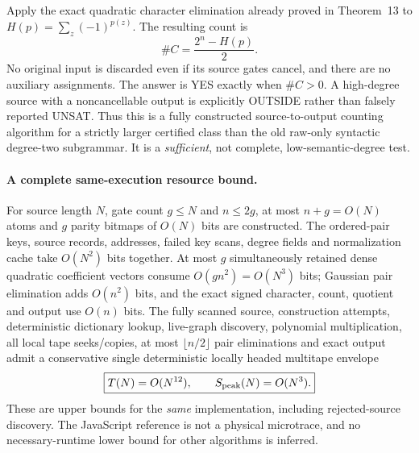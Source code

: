 \documentclass[11pt]{article}
\begin{document}
Apply the exact quadratic character elimination already proved in
Theorem~13 to
\(H(p)=\sum_z(-1)^{p(z)}\).  The resulting count is
\[
\boxed{\#C=\frac{2^n-H(p)}{2}.}
\]
No original input is discarded even if its source gates cancel, and
there are no auxiliary assignments.  The answer is YES exactly when
\(\#C>0\).  A high-degree source with a noncancellable output is
explicitly OUTSIDE rather than falsely reported UNSAT.
Thus this is a fully constructed source-to-output counting algorithm
for a strictly larger certified class than the old raw-only syntactic
degree-two subgrammar.  It is a \emph{sufficient}, not complete,
low-semantic-degree test.

\paragraph{A complete same-execution resource bound.}
For source length \(N\), gate count \(g\le N\) and
\(n\le2g\), at most \(n+g=O(N)\) atoms and \(g\)
parity bitmaps of \(O(N)\) bits are constructed.
The ordered-pair keys, source records, addresses, failed key scans,
degree fields and normalization cache take \(O(N^2)\)
bits together.  At most \(g\) simultaneously retained dense
quadratic coefficient vectors consume \(O(gn^2)=O(N^3)\)
bits; Gaussian pair elimination adds \(O(n^2)\) bits,
and the exact signed character, count, quotient and output use
\(O(n)\) bits.  The fully scanned source, construction attempts,
deterministic dictionary lookup, live-graph discovery, polynomial
multiplication, all local tape seeks/copies, at most
\(\lfloor n/2\rfloor\) pair eliminations and exact output admit
a conservative single deterministic locally headed multitape envelope
\[
\boxed{T(N)=O(N^{12}),\qquad S_{\rm peak}(N)=O(N^3).}
\]
These are upper bounds for the \emph{same} implementation,
including rejected-source discovery.  The JavaScript reference is
not a physical microtrace, and no necessary-runtime lower bound
for other algorithms is inferred.
\end{document}
